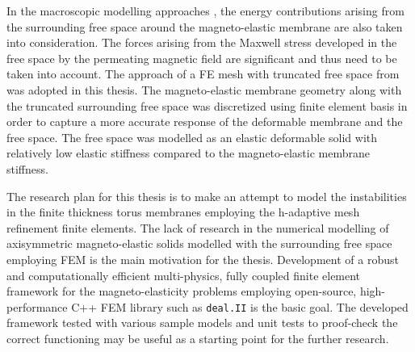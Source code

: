 In the macroscopic modelling approaches \cite{bustamante2013, pelteret2016}, the energy contributions arising from the surrounding free space around the magneto-elastic membrane are also taken into consideration. The forces arising from the Maxwell stress developed in the free space by the permeating magnetic field are significant and thus need to be taken into account. The approach of a FE mesh with truncated free space from \cite{pelteret2016} was adopted in this thesis. The magneto-elastic membrane geometry along with the truncated surrounding free space was discretized using finite element basis in order to capture a more accurate response of the deformable membrane and the free space. The free space was modelled as an elastic deformable solid with relatively low elastic stiffness compared to the magneto-elastic membrane stiffness. \par 
The research plan for this thesis is to make an attempt to model the instabilities in the finite thickness torus membranes employing the h-adaptive mesh refinement finite elements. The lack of research in the numerical modelling of axisymmetric magneto-elastic solids modelled with the surrounding free space employing FEM is the main motivation for the thesis. Development of a robust and computationally efficient multi-physics, fully coupled finite element framework for the magneto-elasticity problems employing open-source, high-performance C++ FEM library such as \texttt{deal.II} \cite{BangerthHartmannKanschat2007, dealII90} is the basic goal. The developed framework tested with various sample models and unit tests to proof-check the correct functioning may be useful as a starting point for the further research. \par

